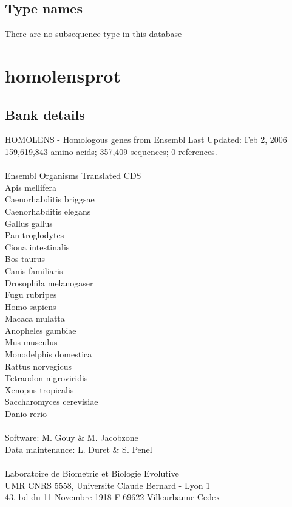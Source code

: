 \documentclass{article}
\begin{document}
\begin{Schunk}
\subsection{Type names}
There are no subsequence type in this database
\section{ homolensprot }
\subsection{Bank details}
HOMOLENS - Homologous genes from Ensembl Last Updated: Feb  2, 2006\\
159,619,843 amino acids; 357,409 sequences; 0 references.\\
\\
Ensembl Organisms Translated CDS\\
Apis mellifera	\\
Caenorhabditis briggsae\\
Caenorhabditis elegans\\
Gallus gallus	\\
Pan troglodytes	\\
Ciona intestinalis\\
Bos taurus 	\\
Canis familiaris	\\
Drosophila melanogaser\\
Fugu rubripes	\\
Homo sapiens	\\
Macaca mulatta	\\
Anopheles gambiae\\
Mus musculus	\\
Monodelphis domestica\\
Rattus norvegicus        	\\
Tetraodon nigroviridis\\
Xenopus tropicalis\\
Saccharomyces cerevisiae\\
Danio rerio	\\
\\
Software: M. Gouy \& M. Jacobzone\\
Data maintenance: L. Duret \& S. Penel\\
\\
Laboratoire de Biometrie et Biologie Evolutive\\
UMR CNRS 5558, Universite Claude Bernard - Lyon 1\\
43, bd du 11 Novembre 1918 F-69622 Villeurbanne Cedex\\



\end{Schunk}
\end{document}
